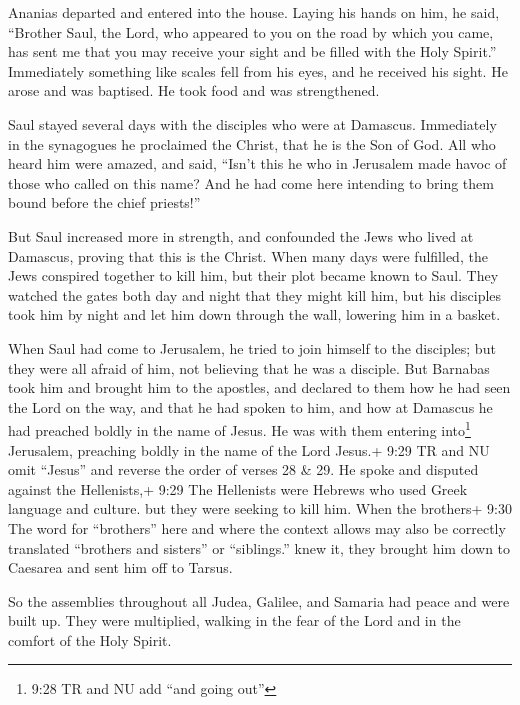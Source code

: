  Ananias departed and entered into the house. Laying his
hands on him, he said, ``Brother Saul, the Lord, who appeared to you on
the road by which you came, has sent me that you may receive your sight
and be filled with the Holy Spirit.''  Immediately
something like scales fell from his eyes, and he received his sight. He
arose and was baptised.  He took food and was strengthened.

Saul stayed several days with the disciples who were at Damascus.
 Immediately in the synagogues he proclaimed the Christ,
that he is the Son of God.  All who heard him were amazed,
and said, ``Isn't this he who in Jerusalem made havoc of those who
called on this name? And he had come here intending to bring them bound
before the chief priests!''

 But Saul increased more in strength, and confounded the
Jews who lived at Damascus, proving that this is the Christ.
 When many days were fulfilled, the Jews conspired together
to kill him,  but their plot became known to Saul. They
watched the gates both day and night that they might kill him,
 but his disciples took him by night and let him down
through the wall, lowering him in a basket.

 When Saul had come to Jerusalem, he tried to join himself
to the disciples; but they were all afraid of him, not believing that he
was a disciple.  But Barnabas took him and brought him to
the apostles, and declared to them how he had seen the Lord on the way,
and that he had spoken to him, and how at Damascus he had preached
boldly in the name of Jesus.  He was with them entering
into\footnote{9:28 TR and NU add ``and going out''} Jerusalem,
 preaching boldly in the name of the Lord Jesus.+ 9:29 TR
and NU omit ``Jesus'' and reverse the order of verses 28 \& 29. He spoke
and disputed against the Hellenists,+ 9:29 The Hellenists were Hebrews
who used Greek language and culture. but they were seeking to kill him.
 When the brothers+ 9:30 The word for ``brothers'' here and
where the context allows may also be correctly translated ``brothers and
sisters'' or ``siblings.'' knew it, they brought him down to Caesarea
and sent him off to Tarsus.

 So the assemblies throughout all Judea, Galilee, and
Samaria had peace and were built up. They were multiplied, walking in
the fear of the Lord and in the comfort of the Holy Spirit.

